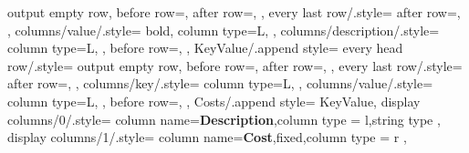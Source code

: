 {{{            output empty row,
            before row={},
            after row={},
        },
        every last row/.style={%
            after row=\bottomrule,
        },
        columns/value/.style={
            bold,
            column type=L{},
        },
        columns/description/.style={
            column type=L{},
        },
        before row=\midrule,
    },
    KeyValue/.append style={
        every head row/.style={
            output empty row,
            before row={},
            after row={},			
        },
        every last row/.style={%
            after row=\bottomrule,
        },
        columns/key/.style={
            column type=L{},
        },
        columns/value/.style={
            column type=L{},
        },
        before row=\midrule,
    },
    Costs/.append style={
        KeyValue,
        display columns/0/.style={
            column name={\textbf{Description}},column type = {l},string type
        },
        display columns/1/.style={
            column name={\textbf{Cost}},fixed,column type = {r}
        },		
    }		
}

